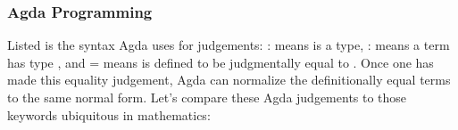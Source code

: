 \begin{code}[hide]
%
\\[\AgdaEmptyExtraSkip]%
\>[0]\AgdaSpace{}%
\AgdaSymbol{=}\AgdaSpace{}%
\<%
\\
%
\\[\AgdaEmptyExtraSkip]%
\>[0]\AgdaSpace{}%
\AgdaSymbol{:}\AgdaSpace{}%
\AgdaSpace{}%
\AgdaSpace{}%
\AgdaSpace{}%
\AgdaSpace{}%
\<%
\\
\>[0]\AgdaSpace{}%
\AgdaSpace{}%
\AgdaSymbol{=}\AgdaSpace{}%
\AgdaSpace{}%
\AgdaSpace{}%
\AgdaSpace{}%
\<%
\\
\>[0]\<%
\end{code}

\subsubsection{Agda Programming}

Listed is the syntax Agda uses for judgements:  :  means
 is a type,  :  means a term  has type ,
and  =  means  is defined to be judgmentally equal to
. Once one has made this equality judgement, Agda can normalize the
definitionally equal terms to the same normal form. Let's compare these Agda
judgements to those keywords ubiquitous in mathematics:

